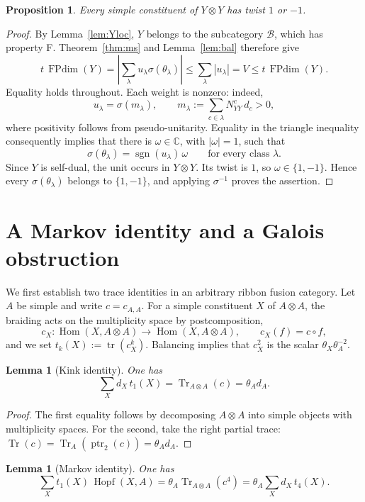 \documentclass[11pt,oneside]{amsart}
\newtheorem{lemma}[theorem]{Lemma}
\newtheorem{proposition}[theorem]{Proposition}
\theoremstyle{remark}
\newcommand{\FP}{\operatorname{FPdim}}
\newcommand{\Tr}{\operatorname{Tr}}
\newcommand{\tr}{\operatorname{tr}}
\newcommand{\ptr}{\operatorname{ptr}}
\newcommand{\Hom}{\operatorname{Hom}}
\newcommand{\Hopf}{\operatorname{Hopf}}
\begin{document}
\begin{proposition}\label{prop:align}
Every simple constituent of $Y\otimes Y$ has twist $1$ or $-1$.
\end{proposition}

\begin{proof}
By Lemma~\ref{lem:Yloc}, $Y$ belongs to the subcategory $\mathcal B$, which
has property F. Theorem~\ref{thm:ms} and Lemma~\ref{lem:bal} therefore give
\[
t\,\FP(Y)
=\left|\sum_\lambda u_\lambda\sigma(\theta_\lambda)\right|
\le\sum_\lambda|u_\lambda|
=V\le t\,\FP(Y).
\]
Equality holds throughout. Each weight is nonzero: indeed,
\[
u_\lambda=\sigma(m_\lambda),\qquad
m_\lambda:=\sum_{c\in\lambda}N_{YY}^c\,d_c>0,
\]
where positivity follows from pseudo-unitarity. Equality in the triangle
inequality consequently implies that there is $\omega\in\mathbb C$, with
$|\omega|=1$, such that
\[
\sigma(\theta_\lambda)=\operatorname{sgn}(u_\lambda)\,\omega
\qquad\text{for every class }\lambda.
\]
Since $Y$ is self-dual, the unit occurs in $Y\otimes Y$. Its twist is $1$,
so $\omega\in\{1,-1\}$. Hence every $\sigma(\theta_\lambda)$ belongs to
$\{1,-1\}$, and applying $\sigma^{-1}$ proves the assertion.
\end{proof}

\section{A Markov identity and a Galois obstruction}\label{sec:QO}

We first establish two trace identities in an arbitrary ribbon fusion
category. Let $A$ be simple and write $c=c_{A,A}$. For a simple constituent
$X$ of $A\otimes A$, the braiding acts on the multiplicity space by
postcomposition,
\[
c_X:\Hom(X,A\otimes A)\to\Hom(X,A\otimes A),\qquad c_X(f)=c\circ f,
\]
and we set $t_k(X):=\tr(c_X^k)$. Balancing implies that $c_X^2$ is the scalar
$\theta_X\theta_A^{-2}$.

\begin{lemma}[Kink identity]\label{lem:kink}
One has
\[
\sum_Xd_X\,t_1(X)=\Tr_{A\otimes A}(c)=\theta_A d_A.
\]
\end{lemma}

\begin{proof}
The first equality follows by decomposing $A\otimes A$ into simple objects
with multiplicity spaces. For the second, take the right partial trace:
$\Tr(c)=\Tr_A(\ptr_2(c))=\theta_A d_A$.
\end{proof}

\begin{lemma}[Markov identity]\label{lem:markov}
One has
\[
\sum_Xt_1(X)\,\Hopf(X,A)
=\theta_A\Tr_{A\otimes A}(c^4)
=\theta_A\sum_Xd_X\,t_4(X).
\]
\end{lemma}
\end{document}
